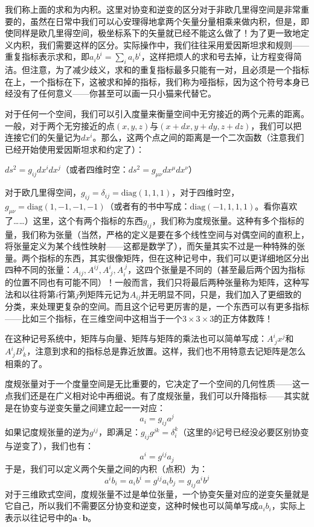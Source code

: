 \documentclass{ctexart}
\begin{document}
我们称上面的求和为内积。这里对协变和逆变的区分对于非欧几里得空间是非常重要的，虽然在日常中我们可以心安理得地拿两个矢量分量相乘来做内积，但是，即使同样是欧几里得空间，极坐标系下的矢量就已经不能这么做了！为了更一致地定义内积，我们需要这样的区分。实际操作中，我们往往采用爱因斯坦求和规则——重复指标表示求和，即$a_ib^i=\sum_ia_ib^i$，这样把烦人的求和号去掉，让方程变得简洁。但注意，为了减少歧义，求和的重复指标最多只能有一对，且必须是一个指标在上，一个指标在下，这被求和掉的指标，我们称为哑指标，因为这个符号本身已经没有了任何意义——你甚至可以画一只小猫来代替它。

对于任何一个空间，我们可以引入度量来衡量空间中无穷接近的两个元素的距离。一般，对于两个无穷接近的点$(x,y,z)$与$(x+dx,y+dy,z+dz)$，我们可以把连接它们的矢量记为$dx^i$。那么，这两个点之间的距离是一个二次函数（注意我们已经开始使用爱因斯坦求和约定了）：

$ds^2=g_{ij}dx^idx^j$（或者四维时空：$ds^2=g_{\mu\nu}dx^\mu dx^\nu$）

对于欧几里得空间，$g_{ij}=\delta_{ij}=\mathrm{diag}(1,1,1)$，对于四维时空，$g_{\mu\nu}=\mathrm{diag}(1,-1,-1,-1)$（或者有的书中写成：$\mathrm{diag}(-1,1,1,1)$。看你喜欢了……）这里，这个有两个指标的东西$g_{ij}$，我们称为度规张量。这种有多个指标的量，我们称为张量（当然，严格的定义是要在多个线性空间与对偶空间的直积上，将张量定义为某个线性映射——这都是数学了），而矢量其实不过是一种特殊的张量。两个指标的东西，其实很像矩阵，但在这种记号中，我们可以更详细地区分出四种不同的张量：$A_{ij},A^{ij},A_{\ j}^i,A^{\ j}_i$，这四个张量是不同的（甚至最后两个因为指标的位置不同也有可能不同）！一般而言，我们只将最后两种张量称为矩阵，这种写法和以往将第$i$行第$j$列矩阵元记为$A_{ij}$并无明显不同，只是，我们加入了更细致的分类，来处理更复杂的空间。而且这个记号更厉害的是，一个东西可以有更多指标——比如三个指标，在三维空间中这相当于一个$3\times3\times3$的正方体数阵！

在这种记号系统中，矩阵与向量、矩阵与矩阵的乘法也可以简单写成：$A^i_{\ j}x^j$和$A^i_{\ j}B^j_{\ k}$，注意到求和的指标总是靠近放置。这样，我们也不用特意去记矩阵是怎么相乘的了。

度规张量对于一个度量空间是无比重要的，它决定了一个空间的几何性质——这一点我们还是在广义相对论中再细说。有了度规张量，我们可以升降指标——其实就是在协变与逆变矢量之间建立起一一对应：
\begin{equation}
a_i=g_{ij}a^j
\end{equation}
如果记度规张量的逆为$g^{ij}$，即满足：$g_{ij}g^{jk}=\delta_i^k$（这里的$\delta$记号已经没必要区别协变与逆变了），我们也有：
\begin{equation}
a^i=g^{ij}a_j
\end{equation}
于是，我们可以定义两个矢量之间的内积（点积）为：
\begin{equation}
a^ib_i=a_ib^i=g^{ij}a_ib_j=g_{ij}a^ib^j
\end{equation}
对于三维欧式空间，度规张量不过是单位张量，一个协变矢量对应的逆变矢量就是它自己，所以我们不需要区分协变和逆变，这种时候也可以简单写成$a_ib_i$，实际上表示以往记号中的$\bm{a}\cdot\bm{b}$。
\end{document}
